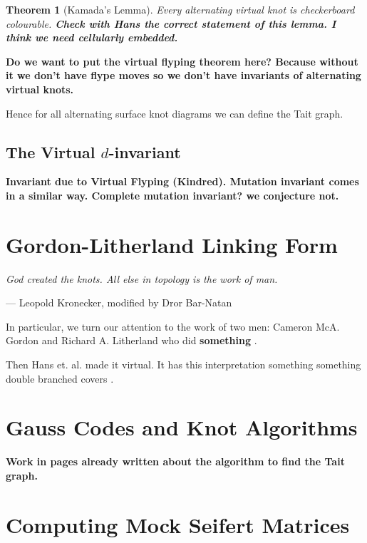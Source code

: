 \documentclass[12pt]{report}
\newcommand{\notered}[1]{{\color{Red} \textbf{#1}}}
\newcommand{\notegreen}[1]{{\color{Green} \textbf{#1}}}
\newtheorem*{theorem}{Theorem}
\begin{document}
\begin{theorem}[Kamada's Lemma]
	Every alternating virtual knot is checkerboard colourable. \notered{Check with Hans the correct statement of this lemma. I think we need cellularly embedded.}
\end{theorem}

\notered{Do we want to put the virtual flyping theorem here? Because without it we don't have flype moves so we don't have invariants of alternating virtual knots.}

Hence for all alternating surface knot diagrams we can define the Tait graph. 

\section{The Virtual $d$-invariant}
\notegreen{Invariant due to Virtual Flyping (Kindred). Mutation invariant comes in a similar way. Complete mutation invariant? we conjecture not.}

\chapter{Gordon-Litherland Linking Form}

\epigraph{\itshape God created the knots. All else in topology is the work of man.}{--- Leopold Kronecker, modified by Dror Bar-Natan}

In particular, we turn our attention to the work of two men: Cameron McA. Gordon and Richard A. Litherland who did \notered{something} \cite{signature-of-a-link}.

Then Hans et. al. made it virtual. It has this interpretation something something double branched covers \cite{gordon-litherland-pairing-thickened-surfaces}.

\chapter{Gauss Codes and Knot Algorithms}
\notered{Work in pages already written about the algorithm to find the Tait graph.}


\chapter{Computing Mock Seifert Matrices}
\end{document}
